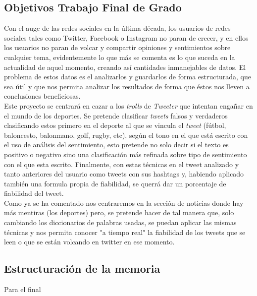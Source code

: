 \documentclass[../all.tex]{subfiles}
\begin{document}
\subsection{Objetivos Trabajo Final de Grado}
    Con el auge de las redes sociales en la última década, los usuarios de redes sociales tales como Twitter, Facebook o Instagram no paran de crecer, y en ellos los usuarios no paran de volcar y compartir opiniones y sentimientos sobre cualquier tema, evidentemente lo que más se comenta es lo que suceda en la actualidad de aquel momento, creando así cantidades inmanejables de datos. El problema de estos datos es el analizarlos y guardarlos de forma estructurada, que sea útil y que nos permita analizar los resultados de forma que éstos nos lleven a conclusiones beneficiosas.\\
    \newline
    Este proyecto se centrará en cazar a los \textit{trolls} de \textit{Tweeter} que  intentan engañar en el mundo de los deportes. Se pretende clasificar \textit{tweets} falsos y verdaderos clasificando estos primero en el deporte al que se vincula el \textit{tweet} (fútbol, baloncesto, balonmano, golf, rugby, etc), según el tono en el que está escrito con el uso de análisis del sentimiento, esto pretende no solo decir si el texto es positivo o negativo sino una clasificación más refinada sobre tipo de sentimiento con el que esta escrito. Finalmente, con estas técnicas en el tweet analizado y tanto anteriores del usuario como tweets con sus hashtags y, habiendo aplicado también una formula propia de fiabilidad, se querrá dar un porcentaje de fiabilidad del tweet.\\
    \newline
    Como ya se ha comentado nos centraremos en la sección de noticias donde hay más mentiras (los deportes) pero, se pretende hacer de tal manera que, solo cambiando los diccionarios de palabras usadas, se puedan aplicar las mismas técnicas y nos permita conocer "a tiempo real" la fiabilidad de los tweets que se leen o que se están volcando en twitter en ese momento. 

\newpage
\subsection{Estructuración de la memoria}
{\color{red} Para el final}
\end{document}
